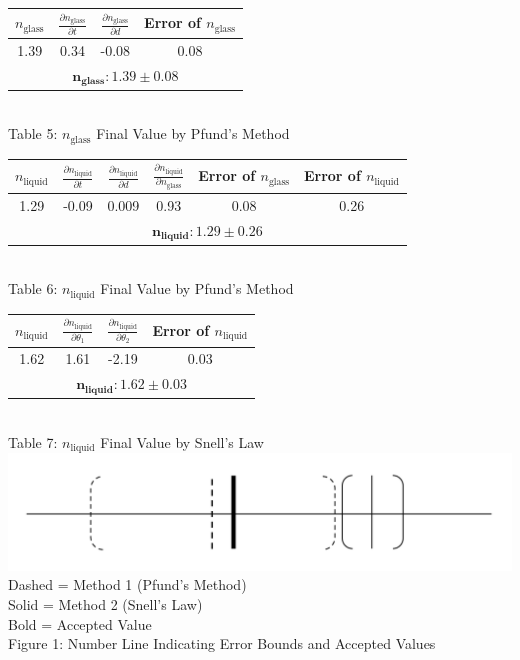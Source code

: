 \begin{center}
    \centering
    \begin{tabular}{|c|c|c|c|}
    \hline
        $n_\text{glass}$ & $\frac{\partial n_\text{glass}}{\partial t}$ & $\frac{\partial n_\text{glass}}{\partial d}$ & Error of $n_\text{glass}$ \\ \hline
        1.39 & 0.34 & -0.08 & 0.08 \\ \hline
        \multicolumn{4}{|c|}{$\bm{n_\textbf{glass}: 1.39\pm0.08}$}\\\hline
    \end{tabular}
    \vspace{3mm}
    \\ Table 5: $n_\text{glass}$ Final Value by Pfund's Method\\
    \vspace{5mm}
    \centering
    \begin{tabular}{|c|c|c|c|c|c|}
    \hline
        $n_\text{liquid}$ & $\frac{\partial n_\text{liquid}}{\partial t}$ & $\frac{\partial n_\text{liquid}}{\partial d}$ & $\frac{\partial n_\text{liquid}}{\partial n_{\text{glass}}}$ & Error of $n_\text{glass}$ & Error of $n_\text{liquid}$ \\ \hline
        1.29 & -0.09 & 0.009 & 0.93 & 0.08 & 0.26 \\ \hline
        \multicolumn{6}{|c|}{$\bm{n_\textbf{liquid}: 1.29\pm0.26}$}\\\hline
    \end{tabular} 
    \vspace{3mm}
    \\ Table 6: $n_\text{liquid}$ Final Value by Pfund's Method\\
    \vspace{5mm} 
    \centering
    \begin{tabular}{|c|c|c|c|}
    \hline
        $n_\text{liquid}$ & $\frac{\partial n_\text{liquid}}{\partial \theta_1}$ & $\frac{\partial n_\text{liquid}}{\partial \theta_2}$  & Error of $n_\text{liquid}$ \\ \hline
        1.62 & 1.61 & -2.19 & 0.03  \\ \hline
        \multicolumn{4}{|c|}{$\bm{n_\textbf{liquid}: 1.62\pm0.03}$}\\\hline
    \end{tabular} 
    \vspace{3mm}
    \\ Table 7: $n_\text{liquid}$ Final Value by Snell's Law\\
    \vspace{5mm}
    \includegraphics[scale=0.5]{number line.png}\\
    Dashed = Method 1 (Pfund's Method)\\
    Solid = Method 2 (Snell's Law)\\
    Bold = Accepted Value \\
    Figure 1: Number Line Indicating Error Bounds and Accepted Values
        
\end{center}